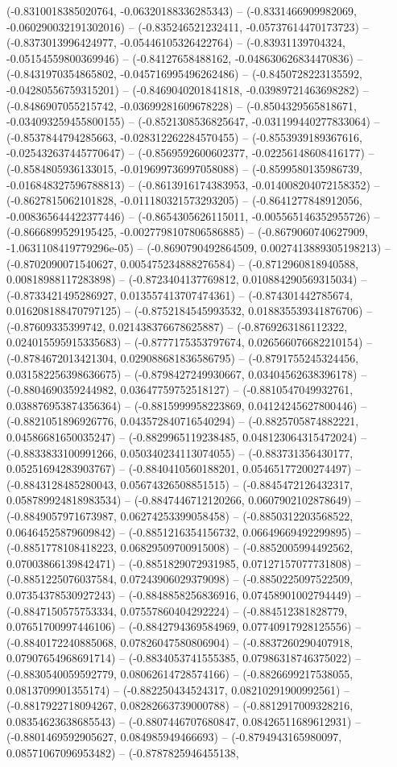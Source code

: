 (-0.8310018385020764, -0.06320188336285343) -- (-0.8331466909982069, -0.060290032191302016) -- (-0.835246521232411, -0.05737614470173723) -- (-0.8373013996424977, -0.05446105326422764) -- (-0.83931139704324, -0.05154559800369946) -- (-0.84127658488162, -0.048630626834470836) -- (-0.8431970354865802, -0.045716995496262486) -- (-0.8450728223135592, -0.04280556759315201) -- (-0.8469040201841818, -0.03989721463698282) -- (-0.8486907055215742, -0.03699281609678228) -- (-0.8504329565818671, -0.034093259455800155) -- (-0.8521308536825647, -0.031199440277833064) -- (-0.8537844794285663, -0.028312262284570455) -- (-0.8553939189367616, -0.025432637445770647) -- (-0.8569592600602377, -0.02256148608416177) -- (-0.8584805936133015, -0.019699736997058088) -- (-0.8599580135986739, -0.016848327596788813) -- (-0.8613916174383953, -0.014008204072158352) -- (-0.8627815062101828, -0.011180321573293205) -- (-0.8641277848912056, -0.008365644422377446) -- (-0.8654305626115011, -0.005565146352955726) -- (-0.8666899529195425, -0.0027798107806586885) -- (-0.8679060740627909, -1.0631108419779296e-05) -- (-0.8690790492864509, 0.0027413889305198213) -- (-0.8702090071540627, 0.005475234888276584) -- (-0.8712960818940588, 0.00818988117283898) -- (-0.8723404137769812, 0.010884290569315034) -- (-0.8733421495286927, 0.013557413707474361) -- (-0.874301442785674, 0.016208188470797125) -- (-0.8752184545993532, 0.018835539341876706) -- (-0.87609335399742, 0.021438376678625887) -- (-0.8769263186112322, 0.024015595915335683) -- (-0.8777175353797674, 0.026566076682210154) -- (-0.8784672013421304, 0.029088681836586795) -- (-0.8791755245324456, 0.031582256398636675) -- (-0.8798427249930667, 0.03404562638396178) -- (-0.8804690359244982, 0.03647759752518127) -- (-0.8810547049932761, 0.038876953874356364) -- (-0.8815999958223869, 0.04124245627800446) -- (-0.8821051896926776, 0.043572840716540294) -- (-0.8825705874882221, 0.04586681650035247) -- (-0.8829965119238485, 0.048123064315472024) -- (-0.8833833100991266, 0.050340234113074055) -- (-0.883731356430177, 0.05251694283903767) -- (-0.8840410560188201, 0.05465177200274497) -- (-0.8843128485280043, 0.05674326508851515) -- (-0.8845472126432317, 0.058789924818983534) -- (-0.8847446712120266, 0.0607902102878649) -- (-0.8849057971673987, 0.06274253399058458) -- (-0.8850312203568522, 0.06464525879609842) -- (-0.8851216354156732, 0.06649669492299895) -- (-0.8851778108418223, 0.06829509700915008) -- (-0.8852005994492562, 0.07003866139842471) -- (-0.8851829072931985, 0.07127157077731808) -- (-0.8851225076037584, 0.07243906029379098) -- (-0.8850225097522509, 0.07354378530927243) -- (-0.8848858256836916, 0.07458901002794449) -- (-0.8847150575753334, 0.07557860404292224) -- (-0.884512381828779, 0.07651700997446106) -- (-0.8842794369584969, 0.07740917928125556) -- (-0.8840172240885068, 0.07826047580806904) -- (-0.8837260290407918, 0.07907654968691714) -- (-0.8834053741555385, 0.07986318746375022) -- (-0.8830540059592779, 0.08062614728574166) -- (-0.8826699217538055, 0.0813709901355174) -- (-0.882250434524317, 0.08210291900992561) -- (-0.8817922718094267, 0.08282663739000788) -- (-0.8812917009328216, 0.08354623638685543) -- (-0.8807446707680847, 0.08426511689612931) -- (-0.8801469592905627, 0.084985949466693) -- (-0.8794943165980097, 0.08571067096953482) -- (-0.8787825946455138, 